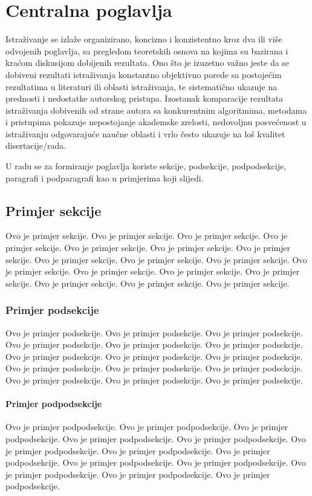 \chapter{Centralna poglavlja}

Istraživanje se izlaže organizirano, koncizno i konzistentno kroz dva ili više odvojenih poglavlja, sa  pregledom teoretskih osnova na kojima su bazirana i kraćom diskusijom dobijenih rezultata. Ono što je izuzetno važno jeste da se dobiveni rezultati istraživanja konstantno objektivno porede sa postojećim rezultatima u literaturi ili oblasti istraživanja, te sistematično ukazuje na prednosti i nedostatke autorskog pristupa.
Izostanak komparacije rezultata istraživanja dobivenih od strane autora sa konkurentnim algoritmima, metodama i pristupima pokazuje nepostojanje akademske zrelosti, nedovoljnu posvećenost u istraživanju odgovarajuće naučne oblasti i vrlo često ukazuje na loš kvalitet disertacije/rada.

U radu se za formiranje poglavlja koriste sekcije, podsekcije, podpodsekcije, paragrafi i podparagrafi kao u primjerima koji slijedi.
 
\section{Primjer sekcije}
Ovo je primjer sekcije. Ovo je primjer sekcije. Ovo je primjer sekcije. Ovo je primjer sekcije. Ovo je primjer sekcije. Ovo je primjer sekcije. Ovo je primjer sekcije. Ovo je primjer sekcije. Ovo je primjer sekcije. Ovo je primjer sekcije. Ovo je primjer sekcije. Ovo je primjer sekcije. Ovo je primjer sekcije. Ovo je primjer sekcije. Ovo je primjer sekcije. Ovo je primjer sekcije. Ovo je primjer sekcije.
\subsection{Primjer podsekcije}
Ovo je primjer podsekcije. Ovo je primjer podsekcije. Ovo je primjer podsekcije. Ovo je primjer podsekcije. Ovo je primjer podsekcije. Ovo je primjer podsekcije. Ovo je primjer podsekcije. Ovo je primjer podsekcije. Ovo je primjer podsekcije. Ovo je primjer podsekcije. Ovo je primjer podsekcije. Ovo je primjer podsekcije. Ovo je primjer podsekcije. Ovo je primjer podsekcije. Ovo je primjer podsekcije.
\subsubsection{Primjer podpodsekcije}
Ovo je primjer podpodsekcije. Ovo je primjer podpodsekcije. Ovo je primjer podpodsekcije. Ovo je primjer podpodsekcije. Ovo je primjer podpodsekcije. Ovo je primjer podpodsekcije. Ovo je primjer podpodsekcije. Ovo je primjer podpodsekcije. Ovo je primjer podpodsekcije. Ovo je primjer podpodsekcije. Ovo je primjer podpodsekcije. Ovo je primjer podpodsekcije. Ovo je primjer podpodsekcije.
